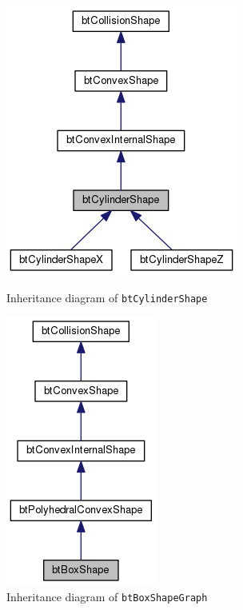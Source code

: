 \begin{figure}[ht]
\centering
\begin{minipage}{.45\linewidth}
\centering
\includegraphics[scale=0.5]{img/RigidBodies/btCylinderShapeGraph.png}
\caption{Inheritance diagram of \texttt{btCylinderShape}}
\label{fig: btCylSgraph}
\end{minipage}
\hspace{.05\linewidth}
\begin{minipage}{.45\linewidth}
\centering
\includegraphics[scale=0.5]{img/RigidBodies/btBoxShapeGraph.png}
\caption{Inheritance diagram of \texttt{btBoxShapeGraph}}
\label{fig: btBoxSgraph}
\end{minipage}
\end{figure}

